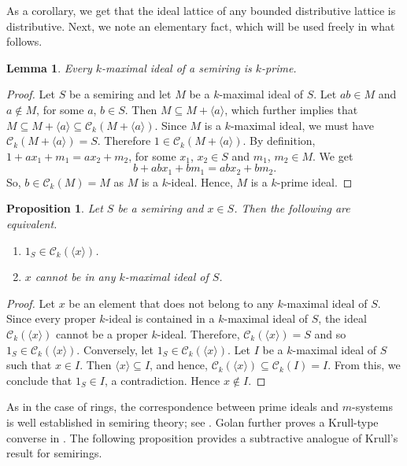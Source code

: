 \documentclass[11pt,leqno]{amsart}
\newtheorem{proposition}[theorem]{Proposition}
\newtheorem{lemma}[theorem]{Lemma}
\theoremstyle{definition}
\numberwithin{equation}{section}
\begin{document}
As a corollary, we get that the ideal lattice of any bounded distributive lattice is distributive. 
Next, we note an elementary fact, which will be used freely in what follows.
\begin{lemma}\label{loc16}
    Every $k$-maximal ideal of a semiring is $k$-prime.
\end{lemma}
    
\begin{proof}
    Let $S$ be a semiring and let $M$ be a $k$-maximal ideal of $S$. Let $ab \in M$ and $a \notin M$, for some $a$, $b \in S$. Then $M \subseteq M+\langle a\rangle$, which further implies that $M \subseteq M+\langle a\rangle  \subseteq \mathcal{C}_k(M+\langle a\rangle)$. Since $M$ is a $k$-maximal ideal, we must have $\mathcal{C}_k(M+\langle a\rangle)= S$. Therefore $1 \in \mathcal{C}_k(M+\langle a\rangle)$. By definition, $1+ ax_1+m_1 = ax_2+m_2$, for some $x_1$, $x_2 \in S$ and $m_1$, $m_2 \in M$. We get $$b+abx_1+bm_1 = abx_2+bm_2.$$ So, $b \in \mathcal{C}_k(M)=M$ as $M$ is a $k$-ideal. Hence, $M$ is a  $k$-prime ideal. 
\end{proof}

\begin{proposition}
    Let $S$ be a semiring and $x\in S$. Then the following are equivalent.
    \begin{enumerate}
        \item $1_{S}\in \mathcal{C}_k(\langle x \rangle)$.
        \item $x$ cannot be in any $k$-maximal ideal of $S$.
    \end{enumerate}
\end{proposition}

\begin{proof}
    Let $x$ be an element that does not belong to any $k$-maximal ideal of $S$. Since every proper $k$-ideal is contained in a $k$-maximal ideal of $S$, the ideal $\mathcal{C}_k(\langle x \rangle)$ cannot be a proper $k$-ideal. Therefore, $\mathcal{C}_k(\langle x \rangle)=S$ and so $1_{S}\in \mathcal{C}_k(\langle x \rangle)$. Conversely, let $1_{S} \in \mathcal{C}_k(\langle x \rangle)$. Let $I$ be a $k$-maximal ideal of $S$ such that $x\in I$. Then $\langle x \rangle\subseteq I$, and hence, $\mathcal{C}_k(\langle x \rangle) \subseteq \mathcal{C}_k(I)=I$. From this, we conclude that $1_{S} \in I$, a contradiction. Hence $x\notin I$.
\end{proof}

As in the case of rings, the correspondence between prime ideals and $m$-systems is well established in semiring theory; see \cite[Corollary 7.11]{Golan}. Golan further proves a Krull-type converse in \cite[Proposition 7.12]{Golan}. The following proposition provides a subtractive analogue of Krull’s result for semirings. 
\end{document}
